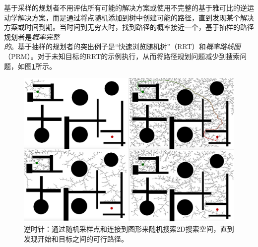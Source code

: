 基于采样的规划者不用评估所有可能的解决方案或使用不完整的基于雅可比的逆运动学解决方案，而是通过将点随机添加到树中创建可能的路径，直到发现某个解决方案或时间到期。当时间到无穷大时，找到路径的概率接近一个，基于抽样的路径规划者是\emph{概率完整的}。基于抽样的规划者的突出例子是“快速浏览随机树”（RRT）\cite{lavalle1998rapidly}和\emph{概率路线图}（PRM）\cite{kavraki1996probabilistic}。对于未知目标的RRT的示例执行，从而将路径规划问题减少到搜索问题，如图\ref{fig:rrt}所示。

\begin{figure}
\centering
\includegraphics[width=\textwidth]{figs/irrt}
\caption{逆时针：通过随机采样点和连接到图形来随机搜索2D搜索空间，直到发现开始和目标之间的可行路径。\label{fig:rrt}}
\end{figure}


